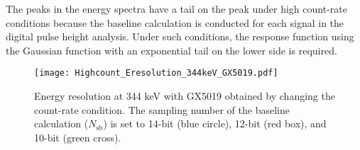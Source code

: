 The peaks in the energy spectra have a tail on the peak under high count-rate conditions because the baseline calculation is conducted for each signal in the digital pulse height analysis. 
Under such conditions, the response function using the Gaussian function with an exponential tail on the lower side is required. %


\begin{figure}
  \centering
  \texttt{[image: Highcount\_Eresolution\_344keV\_GX5019.pdf]}
  \caption{Energy resolution at 344 keV with GX5019 obtained by changing the count-rate condition. The sampling number of the baseline calculation ($N_\mathrm{sb}$) is set to 
  14-bit (blue circle), 12-bit (red box), and 10-bit (green cross).}
  \label{fig:Highcount_Eresolution}
\end{figure}
